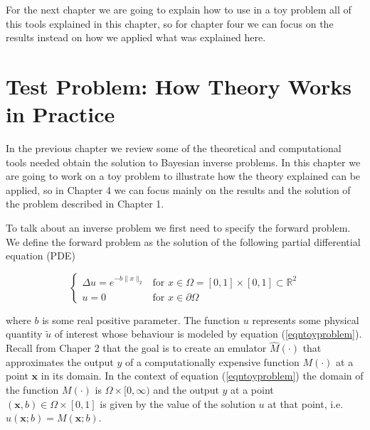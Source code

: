\documentclass[12pt]{book}
\begin{document}
 

For the next chapter we are going to explain how to use in a toy problem all of this tools explained in this 
chapter, so for chapter four we can focus on the results instead on how we applied what was explained here. 



\chapter{Test Problem: How Theory Works in Practice}

In the previous chapter we review some  of the theoretical and computational tools needed obtain
the solution to Bayesian inverse problems. In this chapter
we are going to work on a toy problem to illustrate how the theory explained can be applied, so
in Chapter 4 we can focus mainly on the results and the  solution of the problem described in Chapter 1.


To talk about an inverse problem  we first need to specify  the forward problem. 
We define the forward problem as the solution of the  following
partial differential equation (PDE)

\begin{equation}\label{eqntoyproblem}
\left\{
	\begin{array}{ll}
		\Delta u=e^{-b\|x\|_{2}} &\mbox{for } x\in\Omega=[0,1]\times [0,1]\subset\mathbb{R}^{2} \\
		u=0 & \mbox{for } x\in\partial\Omega
	\end{array}
\right.
\end{equation} 

where $b$ is some real positive parameter. The 
function $u$ represents some physical quantity $\tilde{u}$ of interest whose behaviour is  modeled by equation (\ref{eqntoyproblem}).
Recall from Chaper 2 that the goal is to create an emulator $\hat{M}(\cdot)$  that approximates
the output $y$  of a computationally expensive function  $M(\cdot)$ at a point $\textbf{x}$ in its domain. 
In the context of equation (\ref{eqntoyproblem}) the domain of the function $M(\cdot)$ is $\Omega\times[0,\infty)$
and the output $y$ at a point $(\textbf{x},b)\in\Omega\times [0,1]$ is given by the value of the solution $u$ at that 
point, i.e. $u(\textbf{x};b)=M(\textbf{x};b)$. 
\end{document}
